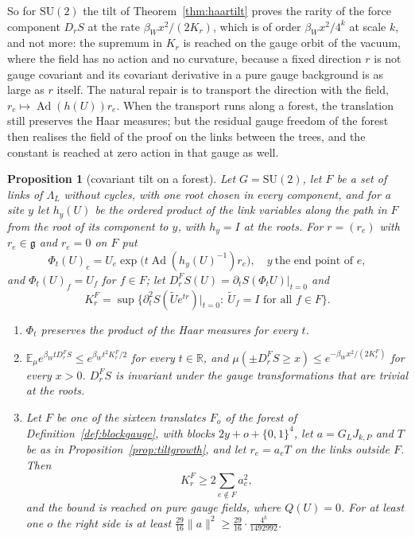 \documentclass[11pt]{amsart}
\newtheorem{proposition}[theorem]{Proposition}
\theoremstyle{definition}
\theoremstyle{remark}
\numberwithin{equation}{section}
\newcommand{\R}{\mathbb{R}}
\newcommand{\E}{\mathbb{E}}
\newcommand{\SU}{\mathrm{SU}}
\newcommand{\g}{\mathfrak{g}}
\begin{document}
So for $\SU(2)$ the tilt of Theorem~\ref{thm:haartilt} proves the rarity
of the force component $D_rS$ at the rate $\beta_Wx^2/(2K_r)$, which is of
order $\beta_Wx^2/4^k$ at scale $k$, and not more: the supremum in $K_r$ is
reached on the gauge orbit of the vacuum, where the field has no action
and no curvature, because a fixed direction $r$ is not gauge covariant and
its covariant derivative in a pure gauge background is as large as $r$
itself. The natural repair is to transport the direction with the field,
$r_e\mapsto\operatorname{Ad}(h(U))r_e$. When the transport runs along a
forest, the translation still preserves the Haar measures; but the
residual gauge freedom of the forest then realises the field of the proof
on the links between the trees, and the constant is reached at zero action
in that gauge as well.

\begin{proposition}[covariant tilt on a forest]\label{prop:foresttilt}
Let $G=\SU(2)$, let $F$ be a set of links of $\Lambda_L$ without cycles,
with one root chosen in every component, and for a site $y$ let $h_y(U)$
be the ordered product of the link variables along the path in $F$ from
the root of its component to $y$, with $h_y=I$ at the roots. For $r=(r_e)$
with $r_e\in\g$ and $r_e=0$ on $F$ put
\[
\Phi_t(U)_e=U_e\exp\bigl(t\operatorname{Ad}(h_y(U)^{-1})r_e\bigr),\quad
y\ \text{the end point of }e,
\]
and $\Phi_t(U)_f=U_f$ for $f\in F$; let $D^F_rS(U)=\partial_tS(\Phi_tU)
|_{t=0}$ and
\[
K^F_r=\sup\bigl\{\partial_t^2S(\tilde Ue^{tr})\big|_{t=0}:\ \tilde U_f=I
\text{ for all }f\in F\bigr\}.
\]
\begin{enumerate}[label=\textup{(\roman*)},leftmargin=*]
\item $\Phi_t$ preserves the product of the Haar measures for every $t$.
\item $\E_\mu e^{\beta_WtD^F_rS}\le e^{\beta_Wt^2K^F_r/2}$ for every
$t\in\R$, and $\mu(\pm D^F_rS\ge x)\le e^{-\beta_Wx^2/(2K^F_r)}$ for every
$x>0$. $D^F_rS$ is invariant under the gauge transformations that are trivial at
the roots.
\item Let $F$ be one of the sixteen translates $F_o$ of the forest of
Definition~\ref{def:blockgauge}, with blocks $2y+o+\{0,1\}^4$, let
$a=G_LJ_{k,P}$ and $T$ be as in Proposition~\ref{prop:tiltgrowth}, and
let $r_e=a_eT$ on the links outside $F$. Then
\[
K^F_r\ge2\sum_{e\notin F}a_e^2,
\]
and the bound is reached on pure gauge fields, where $Q(U)=0$. For at
least one $o$ the right side is at least $\frac{29}{16}\|a\|^2\ge
\frac{29}{16}\cdot\frac{4^k}{1492992}$.
\end{enumerate}
\end{proposition}
\end{document}
